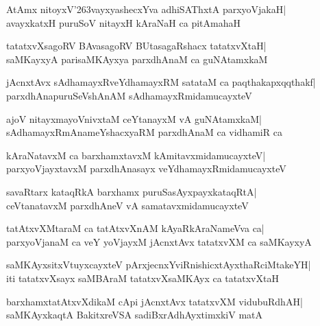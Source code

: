 \documentclass[twoside,12pt,openright]{book}
\def\S{\char'263}
\newcounter{shloka}[chapter]
\begin{document}
\begin{shloka}%
AtAmx nitoyxV\S vayxyashecxYva adhiSAThxtA parxyoVjakaH|\\
avayxkatxH puruSoV nitayxH kAraNaH ca pitAmahaH
\end{shloka}

\begin{shloka}%
tatatxvXsagoRV BAvasagoRV BUtasagaRshacx tatatxvXtaH|\\
saMKayxyA parisaMKAyxya parxdhAnaM ca guNAtamxkaM
\end{shloka}

\begin{shloka}%
jAcnxtAvx sAdhamayxRveYdhamayxRM satataM ca paqthakapxqqthakf|\\
parxdhAnapuruSeVshAnAM sAdhamayxRmidamucayxteV
\end{shloka}

\begin{shloka}%
ajoV nitayxmayoVnivxtaM ceYtanayxM vA guNAtamxkaM|\\
sAdhamayxRmAnameYshacxyaRM parxdhAnaM ca vidhamiR ca
\end{shloka}

\begin{shloka}%
kAraNatavxM ca barxhamxtavxM kAmitavxmidamucayxteV|\\
parxyoVjayxtavxM parxdhAnasayx veYdhamayxRmidamucayxteV
\end{shloka}

\begin{shloka}%
savaRtarx kataqRkA barxhamx puruSasAyxpayxkataqRtA|\\
ceVtanatavxM parxdhAneV vA samatavxmidamucayxteV
\end{shloka}

\begin{shloka}%
tatAtxvXMtaraM ca tatAtxvXnAM kAyaRkAraNameVva ca|\\
parxyoVjanaM ca veY yoVjayxM jAcnxtAvx tatatxvXM ca saMKayxyA
\end{shloka}

\begin{shloka}%
saMKAyxsitxVtuyxcayxteV pArxjecnxYviRnishicxtAyxthaRciMtakeYH|\\
iti tatatxvXsayx saMBAraM tatatxvXsaMKAyx ca tatatxvXtaH
\end{shloka}

\begin{shloka}%
barxhamxtatAtxvXdikaM cApi jAcnxtAvx tatatxvXM vidubuRdhAH|\\
saMKAyxkaqtA BakitxreVSA sadiBxrAdhAyxtimxkiV matA
\end{shloka}
\end{document}
